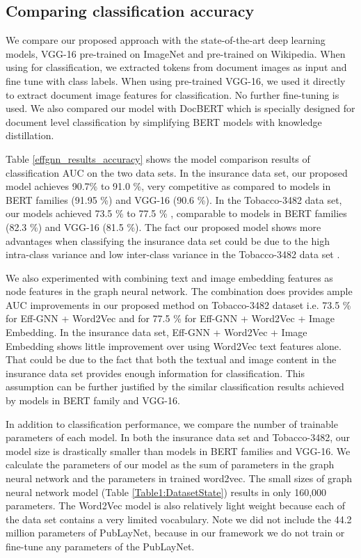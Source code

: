 \documentclass[letterpaper]{article}
\begin{document}
\subsection{Comparing classification accuracy} 
We compare our proposed approach with the state-of-the-art deep learning models, VGG-16 pre-trained on ImageNet and  pre-trained on Wikipedia. When using  for classification, we extracted tokens from document images as input and fine tune  with class labels. When using pre-trained VGG-16, we used it directly to extract document image features for classification. No further fine-tuning is used. We also compared our model with DocBERT which is specially designed for document level classification by simplifying BERT models with knowledge distillation. \par
Table \ref{effgnn_results_accuracy} shows the model comparison results of classification AUC on the two data sets. In the insurance data set, our proposed model achieves 90.7\% to 91.0 \%, very competitive as compared to models in BERT families (91.95 \%) and VGG-16 (90.6 \%). 
In the Tobacco-3482 data set, our models achieved 73.5 \% to 77.5 \% , comparable to models in BERT families (82.3 \%) and VGG-16 (81.5 \%). The fact our proposed model shows more advantages when classifying the insurance data set could be due to the high intra-class variance and low inter-class variance in the Tobacco-3482 data set \cite{KolschAEL17}. \par
We also experimented with combining text and image embedding features as node features in the graph neural network.  The combination does provides ample AUC improvements in our proposed method on Tobacco-3482 dataset  i.e. 73.5 \% for Eff-GNN + Word2Vec and for 77.5 \% for Eff-GNN + Word2Vec + Image Embedding. In the insurance data set, Eff-GNN +  Word2Vec + Image Embedding shows little improvement over using Word2Vec text features alone. That could be due to the fact that both the textual and image content in the insurance data set provides enough information for classification. This assumption can be further justified by the similar classification results achieved by models in BERT family and VGG-16.\par

In addition to classification performance, we compare the number of trainable parameters of each model. In both the insurance data set and Tobacco-3482, our model size is drastically smaller than models in BERT families and VGG-16. We calculate the parameters of our model as the sum of parameters in the graph neural network and the parameters in trained word2vec. The small sizes of graph neural network model (Table \ref{Table1:DatasetState}) results in only 160,000 parameters. The Word2Vec model is also relatively light weight because each of the data set contains a very limited vocabulary. Note we did not include the 44.2 million parameters of PubLayNet, because in our framework we do not train or fine-tune any parameters of the PubLayNet.
\end{document}
